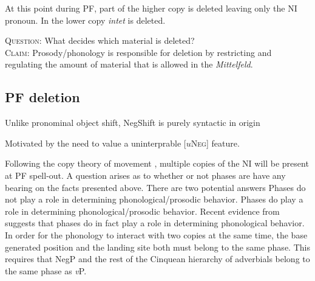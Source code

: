 \documentclass[12pt, letterpaper]{article}
\begin{document}
\ex At this point during PF, part of the higher copy is deleted leaving only the NI pronoun. In the lower copy \emph{intet} is deleted.\\
\label{ex:tree}

\z 

\begin{tcolorbox}[width=\linewidth]
\textsc{Question:} What decides which material is deleted?\\
\textsc{Claim:} Prosody/phonology is responsible for deletion by restricting and regulating the amount of material that is allowed in the \textit{Mittelfeld}.
\end{tcolorbox}

\subsection{PF deletion} \label{sec:PFDeletion}
\ea  Unlike pronominal object shift, NegShift is purely syntactic in origin

	\ea Motivated by the need to value a uninterprable [$u$\textsc{Neg}] feature. 
	\z

\ex Following the copy theory of movement \citet{chomskyMinimalistProgramLinguistic1993}, multiple copies of the NI will be present at PF spell-out. 
\ex A question arises as to whether or not phases are have any bearing on the facts presented above. 
\ex There are two potential answers
	\ea Phases do not play a role in determining phonological/prosodic behavior.  
	\ex Phases do play a role in determining phonological/prosodic behavior.
	\z 
\ex Recent evidence from \citet{weberPhasebasedConstraintsMatch2020} suggests that phases do in fact play a role in determining phonological behavior. 
\ex In order for the phonology to interact with two copies at the same time, the base generated position and the landing site both must belong to the same phase. 
	\ea This requires that NegP and the rest of the Cinquean hierarchy of adverbials \citep{cinqueAdverbsFunctionalHeads1999} belong to the same phase as \emph{v}P.
	\z
\end{document}
